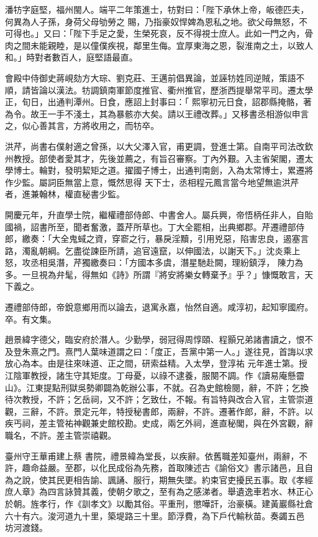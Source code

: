 \begin{pinyinscope}
 潘牥字庭堅，福州閩人。端平二年策進士，牥對曰：「陛下承休上帝，皈德匹夫，何異為人子孫，身荷父母劬勞之
 賜，乃指豪奴悍婢為恩私之地。欲父母無怒，不可得也。」又曰：「陛下手足之愛，生榮死哀，反不得視士庶人。此如一門之內，骨肉之間未能親睦，是以僮僕疾視，鄰里生侮。宜厚東海之恩，裂淮南之土，以致人和。」時對者數百人，庭堅語最直。



 會殿中侍御史蔣峴劾方大琮、劉克莊、王邁前倡異論，並誣牥姓同逆賊，策語不順，請皆論以漢法。牥調鎮南軍節度推官、衢州推官，歷浙西提舉常平司。遷太學正，旬日，出通判潭州。日食，應詔上封事曰：「
 熙寧初元日食，詔郡縣掩骼，著為令。故王一手不淺土，其為暴骸亦大矣。請以王禮改葬。」又移書丞相游似申言之，似心善其言，方將收用之，而牥卒。



 洪芹，尚書右僕射適之曾孫，以大父澤入官，甫更調，登進士第。自南平司法改欽州教授。部使者愛其才，先後並薦之，有旨召審察。丁內外艱。入主省架閣，遷太學博士。輪對，發明絜矩之道。擢國子博士，出通判南劍，入為太常博士，累遷將作少監。屬詞臣無當上意，慨然思得
 天下士，丞相程元鳳言當今地望無逾洪芹者，進兼翰林，權直秘書少監。



 開慶元年，升直學士院，繼權禮部侍郎、中書舍人。屬兵興，帝悟柄任非人，自貽國禍，詔書所至，聞者奮激，蓋芹所草也。丁大全罷相，出典鄉郡。芹遷禮部侍郎，繳奏：「大全鬼蜮之資，穿窬之行，暴戾淫黷，引用兇惡，陷害忠良，遏塞言路，濁亂朝綱。乞盡從諫臣所請，追官遠竄，以伸國法，以謝天下。」沈炎乘上怒，攻丞相吳潛，芹獨繳奏曰：「方國本多虞，潛星馳赴闕，理紛鎮浮，
 陳力為多。一旦視為弁髦，得無如《詩》所謂『將安將樂女轉棄予』乎？」慷慨敢言，天下義之。



 遷禮部侍郎，帝銳意鄉用而以論去，退寓永嘉，怡然自適。咸淳初，起知寧國府。卒。有文集。



 趙景緯字德父，臨安府於潛人。少勤學，弱冠得周惇頤、程顥兄弟諸書讀之，恨不及登朱熹之門。熹門人葉味道謂之曰：「度正，吾黨中第一人。」遂往見，首誨以求放心為本。由是往來味道、正之間，研索益精。入太學，登淳祐
 元年進士第。授江陰軍教授，諸生守其矩度。丁母憂，以祿不逮養，服闋不調。作《讀易庵懸霤山》。江東提點刑獄吳勢卿闢為乾辦公事，不就。召為史館檢閱，辭，不許；乞換待次教授，不許；乞岳祠，又不許；乞致仕，不報。有旨特與改合入官，主管崇道觀，三辭，不許。景定元年，特授秘書郎，兩辭，不許。遷著作郎，辭，不許。以疾丐祠，差主管祐神觀兼史館校勘。史成，兩乞外祠，進直秘閣，與在外宮觀，辭職名，不許。差主管崇禧觀。



 臺州守王華甫建上蔡
 書院，禮景緯為堂長，以疾辭。依舊職差知臺州，兩辭，不許，趣命益嚴。至郡，以化民成俗為先務，首取陳述古《諭俗文》書示諸邑，且自為之說，使其民更相告諭、諷誦、服行，期無失墜。約束官吏擾民五事。取《孝經庶人章》為四言詠贊其義，使朝夕歌之，至有為之感涕者。舉遺逸車若水、林正心於朝。旌孝行，作《訓孝文》以勵其俗。平重刑，懲嘩訐，治豪橫。建黃巖縣社倉六十有六。浚河道九十里，築堤路三十里。節浮費，為下戶代輸秋苗。奏蠲五邑
 坊河渡錢。




\end{pinyinscope}

